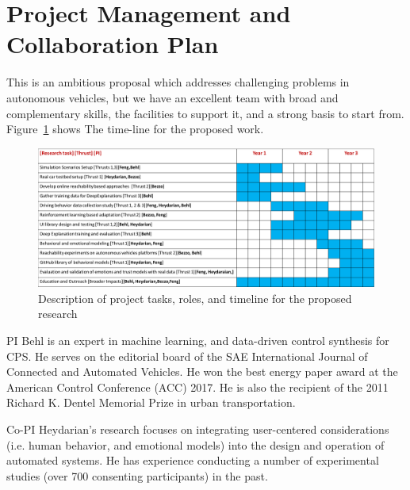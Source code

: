 \section{Project Management and Collaboration Plan}
\label{sec:plan}
This is an ambitious proposal which addresses challenging problems in autonomous vehicles, but we have an excellent team with broad and complementary skills, the facilities to support it, and a strong basis to start from. Figure~\ref{fig:gantt} shows The time-line for the proposed work.
\begin{figure}
    \centering
    \includegraphics[width=0.9\columnwidth]{figures/gantt_plan.png}
    \caption{Description of project tasks, roles, and timeline for the proposed research}
    \label{fig:gantt}
\end{figure}

PI Behl is an expert in machine learning, and data-driven control synthesis for CPS. 
He serves on the editorial board of the SAE International Journal of Connected and Automated Vehicles. He won the best energy paper award at the American Control Conference (ACC) 2017. He is also the recipient of the 2011 Richard K. Dentel Memorial Prize in urban transportation.

Co-PI Heydarian’s research focuses on integrating user-centered considerations (i.e. human behavior, and emotional models) into the design and operation of automated systems. He has experience conducting a number of experimental studies (over 700 consenting participants) in the past.

